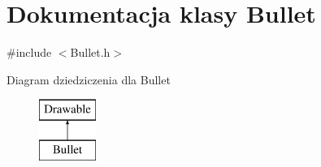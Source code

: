 \hypertarget{class_bullet}{}\section{Dokumentacja klasy Bullet}
\label{class_bullet}


{\ttfamily \#include $<$Bullet.\+h$>$}

Diagram dziedziczenia dla Bullet\begin{figure}[H]
\begin{center}
\leavevmode
\includegraphics[height=2.000000cm]{class_bullet}
\end{center}
\end{figure}
